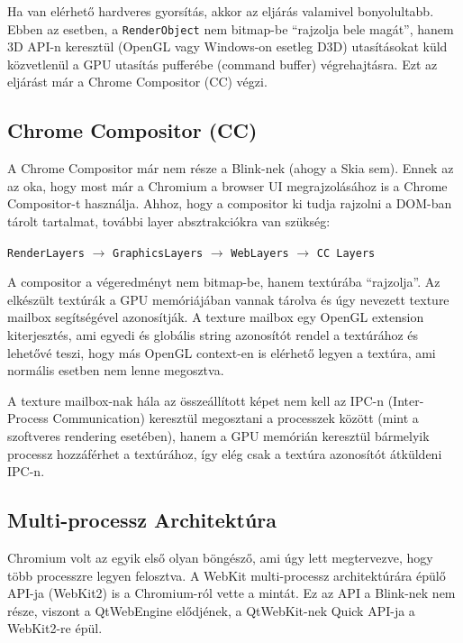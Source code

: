 \documentclass[12pt]{report}
\begin{document}
Ha van elérhető hardveres gyorsítás, akkor az eljárás valamivel bonyolultabb. Ebben az
esetben, a \texttt{RenderObject} nem bitmap-be ``rajzolja bele magát'', hanem 3D API-n
keresztül (OpenGL vagy Windows-on esetleg D3D) utasításokat küld közvetlenül a GPU
utasítás pufferébe (command buffer) végrehajtásra. Ezt az eljárást már a
Chrome Compositor (CC) végzi.
\cite{bib:chromium-gpu, bib:chromium-oopifs}

\subsection{Chrome Compositor (CC)}
A Chrome Compositor már nem része a Blink-nek (ahogy a Skia sem). Ennek az az oka,
hogy most már a Chromium a browser UI megrajzolásához is a Chrome Compositor-t használja.
Ahhoz, hogy a compositor ki tudja rajzolni a DOM-ban tárolt tartalmat, további layer
absztrakciókra van szükség:
\begin{center}
    \texttt{RenderLayers} $\rightarrow$ \texttt{GraphicsLayers} $\rightarrow$
    \texttt{WebLayers} $\rightarrow$ \texttt{CC Layers}
\end{center}

A compositor a végeredményt nem bitmap-be, hanem textúrába ``rajzolja''. Az elkészült
textúrák a GPU memóriájában vannak tárolva és úgy nevezett texture mailbox segítségével
azonosítják. A texture mailbox egy OpenGL extension kiterjesztés, ami egyedi és globális
string azonosítót rendel a textúrához és lehetővé teszi, hogy más OpenGL context-en
is elérhető legyen a textúra, ami normális esetben nem lenne megosztva.
\cite{bib:chromium-gpu, bib:chromium-oopifs}

A texture mailbox-nak hála az összeállított képet nem kell az IPC-n (Inter-Process
Communication) keresztül megosztani a processzek között (mint a szoftveres rendering
esetében), hanem a GPU memórián keresztül bármelyik processz hozzáférhet a textúrához, így
elég csak a textúra azonosítót átküldeni IPC-n.
\cite{bib:chromium-texture-mailbox}

\subsection{Multi-processz Architektúra}
Chromium volt az egyik első olyan böngésző, ami úgy lett megtervezve, hogy több processzre
legyen felosztva. A WebKit multi-processz architektúrára épülő API-ja (WebKit2) is a
Chromium-ról vette a mintát. \cite{bib:webkit-webkit2}
Ez az API a Blink-nek nem része, viszont a QtWebEngine elődjének, a QtWebKit-nek
Quick API-ja a WebKit2-re épül.
\end{document}
